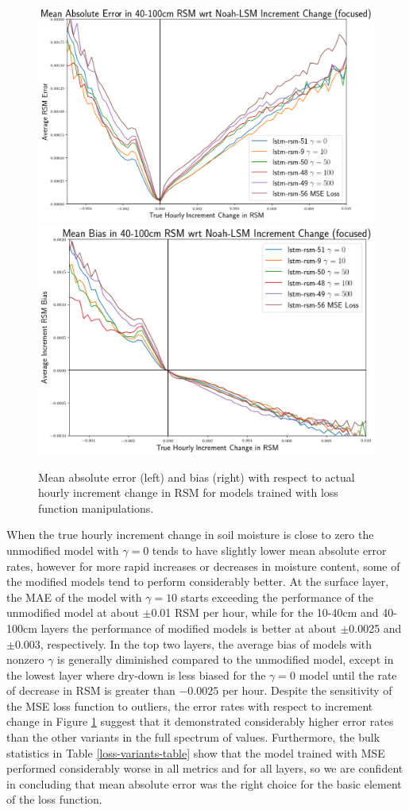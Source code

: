 \begin{figure}[hp!]
    \includegraphics[width=.50\linewidth,draft=false]{figures/error-wrt-increment-change/eval_test_rsm-100_increment-error-1d-focus_abs-err.png}
    \includegraphics[width=.48\linewidth,draft=false]{figures/error-wrt-increment-change/eval_test_rsm-100_increment-error-1d-focus_bias.png}

    \caption{Mean absolute error (left) and bias (right) with respect to actual hourly increment change in RSM for models trained with loss function manipulations.}
    \label{loss-fn-error-wrt-increment}
\end{figure}

When the true hourly increment change in soil moisture is close to zero the unmodified model with $\gamma=0$ tends to have slightly lower mean absolute error rates, however for more rapid increases or decreases in moisture content, some of the modified models tend to perform considerably better. At the surface layer, the MAE of the model with $\gamma=10$ starts exceeding the performance of the unmodified model at about $\pm$0.01 RSM per hour, while for the 10-40cm and 40-100cm layers the performance of modified models is better at about $\pm$0.0025 and $\pm$0.003, respectively. In the top two layers, the average bias of models with nonzero $\gamma$ is generally diminished compared to the unmodified model, except in the lowest layer where dry-down is less biased for the $\gamma=0$ model until the rate of decrease in RSM is greater than $-0.0025$ per hour. Despite the sensitivity of the MSE loss function to outliers, the error rates with respect to increment change in Figure \ref{loss-fn-error-wrt-increment} suggest that it demonstrated considerably higher error rates than the other variants in the full spectrum of values. Furthermore, the bulk statistics in Table \ref{loss-variants-table} show that the model trained with MSE performed considerably worse in all metrics and for all layers, so we are confident in concluding that mean absolute error was the right choice for the basic element of the loss function.

